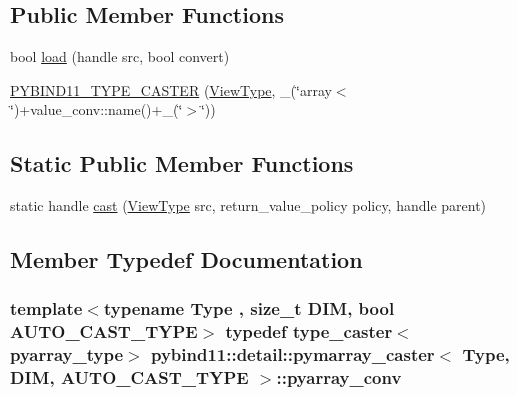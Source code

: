\subsection*{Public Member Functions}
\begin{DoxyCompactItemize}
\item 
bool \hyperlink{structpybind11_1_1detail_1_1pymarray__caster_a86104f2febd079f88902bfbcaf211275}{load} (handle src, bool convert)
\item 
\hyperlink{structpybind11_1_1detail_1_1pymarray__caster_a40c677529b61ffbe09c3031a28c17bfd}{P\+Y\+B\+I\+N\+D11\+\_\+\+T\+Y\+P\+E\+\_\+\+C\+A\+S\+T\+E\+R} (\hyperlink{structpybind11_1_1detail_1_1pymarray__caster_a0593b33c0ed08f1b25b34dbc3da1b01c}{View\+Type}, \+\_\+(\char`\"{}array$<$\char`\"{})+value\+\_\+conv\+::name()+\+\_\+(\char`\"{}$>$\char`\"{}))
\end{DoxyCompactItemize}
\subsection*{Static Public Member Functions}
\begin{DoxyCompactItemize}
\item 
static handle \hyperlink{structpybind11_1_1detail_1_1pymarray__caster_ac614bd95690d2ab5f17c3b2603485404}{cast} (\hyperlink{structpybind11_1_1detail_1_1pymarray__caster_a0593b33c0ed08f1b25b34dbc3da1b01c}{View\+Type} src, return\+\_\+value\+\_\+policy policy, handle parent)
\end{DoxyCompactItemize}


\subsection{Member Typedef Documentation}
\hypertarget{structpybind11_1_1detail_1_1pymarray__caster_a0fe8ba6e31f03c24d130c0dba1a55fa8}{}
\subsubsection[{pyarray\+\_\+conv}]{\setlength{\rightskip}{0pt plus 5cm}template$<$typename Type , size\+\_\+t D\+I\+M, bool A\+U\+T\+O\+\_\+\+C\+A\+S\+T\+\_\+\+T\+Y\+P\+E$>$ typedef type\+\_\+caster$<${\bf pyarray\+\_\+type}$>$ {\bf pybind11\+::detail\+::pymarray\+\_\+caster}$<$ Type, D\+I\+M, A\+U\+T\+O\+\_\+\+C\+A\+S\+T\+\_\+\+T\+Y\+P\+E $>$\+::{\bf pyarray\+\_\+conv}}\label{structpybind11_1_1detail_1_1pymarray__caster_a0fe8ba6e31f03c24d130c0dba1a55fa8}
\hypertarget{structpybind11_1_1detail_1_1pymarray__caster_a70ad611a7f6fd17d02b461c43dff6ea0}{}
